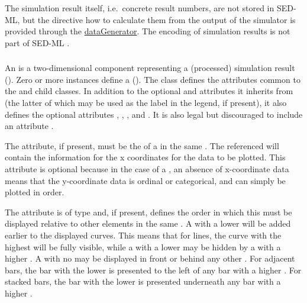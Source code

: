 The simulation result itself, i.e.\ concrete result numbers, are not stored in SED-ML, but the directive how to calculate them from the output of the simulator is provided through the \hyperref[class:dataGenerator]{dataGenerator}. The encoding of simulation results is not part of SED-ML \currentLV.

\begin{blockChanged}
\subsubsection{}
\label{class:abstractCurve}
An \AbstractCurve is a two-dimensional \Output component representing a (processed) simulation result (). Zero or more \AbstractCurve instances define a \PlotTwo ().  The \AbstractCurve class defines the attributes common to the \Curve and \ShadedArea child classes.  In addition to the optional  and  attributes it inherits from \SedBase (the latter of which may be used as the label in the \Plot legend, if present), it also defines the optional attributes , , , and .  It is also legal but discouraged to include an attribute .


The  attribute, if present, must be the  of a \DataGenerator in the same \SedDocument.  The referenced \DataGenerator will contain the information for the x coordinates for the data to be plotted.  This attribute is optional because in the case of a \Curve, an absence of x-coordinate data means that the y-coordinate data is ordinal or categorical, and can simply be plotted in order.

The  attribute is of type  and, if present, defines the order in which this \Curve must be displayed relative to other \Curve elements in the same \Plot.  A \Curve with a lower  will be added earlier to the displayed curves.  This means that for lines, the curve with the highest  will be fully visible, while a \Curve with a lower  may be hidden by a \Curve with a higher .  A \Curve with no  may be displayed in front or behind any other \Curve.  For adjacent bars, the bar with the lower  is presented to the left of any bar with a higher .  For stacked bars, the bar with the lower  is presented underneath any bar with a higher .


\end{blockChanged}
